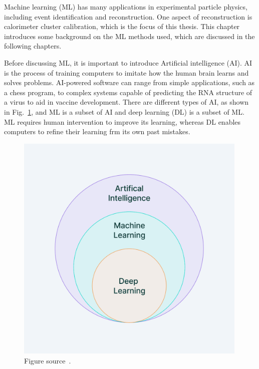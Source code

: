 Machine learning (ML) has many applications in experimental particle physics, including event identification and reconstruction.
One aspect of reconstruction is calorimeter cluster calibration, which is the focus of this thesis.
This chapter introduces some background on the ML methods used, which are discussed in the following chapters. %

Before discussing ML, it is important to introduce Artificial intelligence (AI).
AI is the process of training computers to imitate how the human brain learns and solves problems.
AI-powered software can range from simple applications, such as a chess program, to complex systems capable of predicting the RNA structure of a virus to aid in vaccine development.
There are different types of AI, as shown in Fig.~\ref{fig:ML_diagram}, and ML is a subset of AI and deep learning (DL) is a subset of ML.
ML requires human intervention to improve its learning, whereas DL enables computers to refine their learning frm its own past mistakes.

\begin{figure}[t!]
\centering
\includegraphics[width=0.99\textwidth]{figures/ML_diagram.png}
\caption[ML and AI]{Figure source~\cite{SMtable}.}
\label{fig:ML_diagram}
\end{figure}

